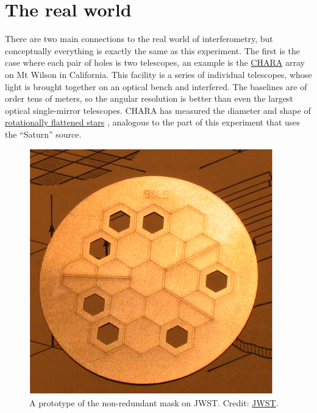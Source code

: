 \documentclass[11pt]{article}
\begin{document}
\clearpage
\section{The real world}\label{sec:realworld}

There are two main connections to the real world of interferometry, but conceptually everything is exactly the same as this experiment. The first is the case where each pair of holes is two telescopes, an example is the \href{https://en.wikipedia.org/wiki/CHARA_array}{CHARA} array on Mt Wilson in California. This facility is a series of individual telescopes, whose light is brought together on an optical bench and interfered. The baselines are of order tens of meters, so the angular resolution is better than even the largest optical single-mirror telescopes.
CHARA has measured the diameter and shape of \href{https://www.chara.gsu.edu/science-highlights/rapid-rotators}{rotationally flattened stars} \citep[e.g.][]{2011ApJ...732...68C}, analogous to the part of this experiment that uses the ``Saturn'' source.

\begin{figure}
    \centering
    \includegraphics{doc/NIRISS_AMI.png}
    \caption{A prototype of the non-redundant mask on JWST. Credit: \href{https://jwst-docs.stsci.edu/jwst-near-infrared-imager-and-slitless-spectrograph/niriss-observing-modes/niriss-aperture-masking-interferometry}{JWST}.}
    \label{fig:ami}
\end{figure}
\end{document}
